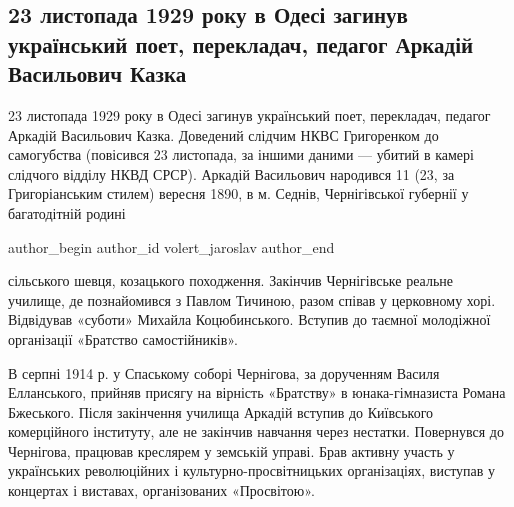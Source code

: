  
 
 
 

 

\subsection{23 листопада 1929 року в Одесі загинув український поет, перекладач, педагог Аркадій Васильович Казка}
\label{sec:22_11_2020.fb.volert_jaroslav.1.arkadii_kazka_odessa_death_23_11_1929}


23 листопада 1929 року в Одесі загинув український поет, перекладач, педагог
Аркадій Васильович Казка.  Доведений слідчим НКВС Григоренком до самогубства
(повісився 23 листопада, за іншими даними --- убитий в камері слідчого відділу
НКВД СРСР).  Аркадій Васильович народився  11 (23, за Григоріанським стилем)
вересня 1890, в м. Седнів, Чернігівської губернії у багатодітній родині

\ifcmt
  author_begin
   author_id volert_jaroslav
  author_end
\fi

сільського шевця, козацького походження. Закінчив Чернігівське реальне училище,
де познайомився з Павлом Тичиною, разом співав у церковному хорі. Відвідував
«суботи» Михайла Коцюбинського. Вступив до таємної молодіжної організації
«Братство самостійників». 

В серпні 1914 р. у Спаському соборі Чернігова, за дорученням Василя
Елланського, прийняв присягу на вірність «Братству»  в юнака-гімназиста Романа
Бжеського. Після закінчення училища Аркадій вступив до Київського комерційного
інституту, але не закінчив навчання через нестатки.  Повернувся до Чернігова,
працював креслярем у земській управі. Брав активну участь у українських
революційних і культурно-просвітницьких організаціях, виступав у концертах і
виставах, організованих «Просвітою». 

